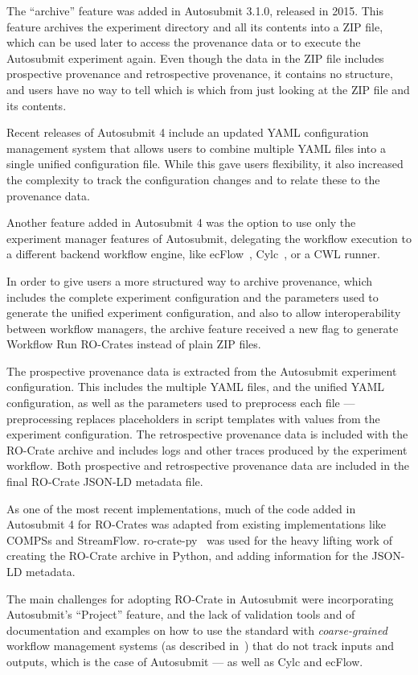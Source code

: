 \documentclass[10pt,letterpaper]{article}
\begin{document}
The ``archive'' feature was added in Autosubmit 3.1.0, released in 2015.
This feature archives the experiment directory and all its contents into a ZIP file, which can be used later to access the provenance data or to execute the Autosubmit experiment again.
Even though the data in the ZIP file includes prospective provenance and retrospective provenance, it contains no structure, and users have no way to tell which is which from just looking at the ZIP file and its contents.

Recent releases of Autosubmit 4 include an updated YAML configuration management system that allows users to combine multiple YAML files into a single unified configuration file.
While this gave users flexibility, it also increased the complexity to track the configuration changes and to relate these to the provenance data.

Another feature added in Autosubmit 4 was the option to use only the experiment manager features of Autosubmit, delegating the workflow execution to a different backend workflow engine, like ecFlow~\cite{Bahra 2011}, Cylc~\cite{Oliver 2023}, or a CWL runner.

In order to give users a more structured way to archive provenance, which includes the complete experiment configuration and the parameters used to generate the unified experiment configuration, and also to allow interoperability between workflow managers, the archive feature received a new flag to generate Workflow Run RO-Crates instead of plain ZIP files.

The prospective provenance data is extracted from the Autosubmit experiment configuration.
This includes the multiple YAML files, and the unified YAML configuration, as well as the parameters used to preprocess each file --- preprocessing replaces placeholders in script templates with values from the experiment configuration.
The retrospective provenance data is included with the RO-Crate archive and includes logs and other traces produced by the experiment workflow.
Both prospective and retrospective provenance data are included in the final RO-Crate JSON-LD metadata file.

As one of the most recent implementations, much of the code added in Autosubmit 4 for RO-Crates was adapted from existing implementations like COMPSs and StreamFlow.
ro-crate-py~\cite{De Geest 2022} was used for the heavy lifting work of creating the RO-Crate archive in Python, and adding information for the JSON-LD metadata.

The main challenges for adopting RO-Crate in Autosubmit were incorporating Autosubmit's ``Project'' feature, and the lack of validation tools and of documentation and examples on how to use the standard with \emph{coarse-grained} workflow management systems (as described in~\cite{Goble 2020}) that do not track inputs and outputs, which is the case of Autosubmit --- as well as Cylc and ecFlow.
\end{document}
